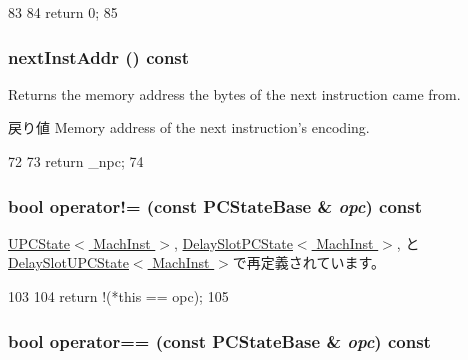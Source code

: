 \begin{DoxyCode}
83     {
84         return 0;
85     }
\end{DoxyCode}
\hypertarget{classGenericISA_1_1PCStateBase_a3886aca2600d9d263e3aa4f94f76ce07}{
\subsubsection[{nextInstAddr}]{ nextInstAddr () const}}
\label{classGenericISA_1_1PCStateBase_a3886aca2600d9d263e3aa4f94f76ce07}
Returns the memory address the bytes of the next instruction came from.

\begin{DoxyReturn}{戻り値}
Memory address of the next instruction's encoding. 
\end{DoxyReturn}



\begin{DoxyCode}
72     {
73         return _npc;
74     }
\end{DoxyCode}
\hypertarget{classGenericISA_1_1PCStateBase_af9600d6b82659d663fd0c8be2cbef409}{
\subsubsection[{operator!=}]{\setlength{\rightskip}{0pt plus 5cm}bool operator!= (const {\bf PCStateBase} \& {\em opc}) const}}
\label{classGenericISA_1_1PCStateBase_af9600d6b82659d663fd0c8be2cbef409}


\hyperlink{classGenericISA_1_1UPCState_ac308decf5b5542401a4d52a91f43331b}{UPCState$<$ MachInst $>$}, \hyperlink{classGenericISA_1_1DelaySlotPCState_aaa54c276268b580f71a09be1cca39cc5}{DelaySlotPCState$<$ MachInst $>$}, と \hyperlink{classGenericISA_1_1DelaySlotUPCState_a62dd495435f7d310779afd1c1a0b42c6}{DelaySlotUPCState$<$ MachInst $>$}で再定義されています。


\begin{DoxyCode}
103     {
104         return !(*this == opc);
105     }
\end{DoxyCode}
\hypertarget{classGenericISA_1_1PCStateBase_a8643649fe59176cb0c5e8b48738c36fe}{
\subsubsection[{operator==}]{\setlength{\rightskip}{0pt plus 5cm}bool operator== (const {\bf PCStateBase} \& {\em opc}) const}}
\label{classGenericISA_1_1PCStateBase_a8643649fe59176cb0c5e8b48738c36fe}


